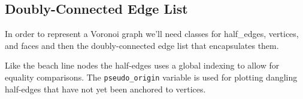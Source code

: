 \documentclass[
  letterpaper,
  DIV=11,
  numbers=noendperiod]{scrartcl}
\newenvironment{Shaded}{\begin{snugshade}}{\end{snugshade}}
\newcommand{\ControlFlowTok}[1]{\textcolor[rgb]{0.00,0.23,0.31}{#1}}
\newcommand{\DecValTok}[1]{\textcolor[rgb]{0.68,0.00,0.00}{#1}}
\newcommand{\FunctionTok}[1]{\textcolor[rgb]{0.28,0.35,0.67}{#1}}
\newcommand{\NormalTok}[1]{\textcolor[rgb]{0.00,0.23,0.31}{#1}}
\newcommand{\SpecialCharTok}[1]{\textcolor[rgb]{0.37,0.37,0.37}{#1}}
\newcommand{\StringTok}[1]{\textcolor[rgb]{0.13,0.47,0.30}{#1}}
\begin{document}
\begin{Shaded}
\end{Shaded}

\begin{Shaded}
\end{Shaded}

\subsection{Doubly-Connected Edge
List}\label{doubly-connected-edge-list}

In order to represent a Voronoi graph we'll need classes for
half\_edges, vertices, and faces and then the doubly-connected edge list
that encapsulates them.

Like the beach line nodes the half-edges uses a global indexing to allow
for equality comparisons. The \texttt{pseudo\_origin} variable is used
for plotting dangling half-edges that have not yet been anchored to
vertices.
\end{document}
